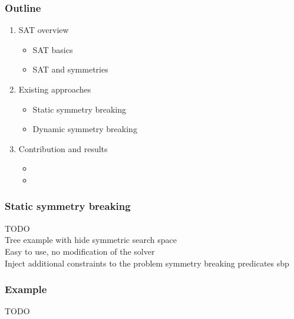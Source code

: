 \documentclass{beamer}
\begin{document}
\begin{frame}
\frametitle{Outline}
\begin{enumerate}
	\item \textcolor{UPMCEngagementBlueB}{SAT overview}
	\begin{itemize}
		\item[] SAT basics
		\item[] SAT and symmetries
	\end{itemize}
	\vspace{5pt}
	\item \textcolor{UPMCEngagementBlueB}{Existing approaches}
	\begin{itemize}
		\item[] Static symmetry breaking
		\item[] Dynamic symmetry breaking
	\end{itemize}
	\vspace{5pt}
	\item \textcolor{UPMCEngagementBlueB}{Contribution and results} 
	\begin{itemize}
		\item[] \phantom{CDCL [Sym]}
		\item[] \phantom{Combination of different approaches}
	\end{itemize}
\end{enumerate}
\end{frame}

\begin{frame}
	\frametitle{Static symmetry breaking}
	TODO\\
	
	Tree example with hide symmetric search space\\
	
	Easy to use, no modification of the solver \\
	
	Inject additional constraints to the problem symmetry breaking predicates sbp\\
	
\end{frame}

\begin{frame}
\frametitle{Example}
TODO\\

\end{frame}
\end{document}

